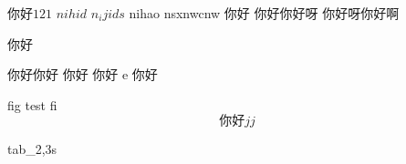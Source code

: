 你好$121$
$nihid$ 
$n_ijids$ nihao
nsxnwcnw
你好
你好你好呀 你好呀你好啊 

你好

你好你好 你好 
你好 e
你好

fig test fi
\begin{equation}
  你好 jj
\end{equation}

tab_2,3s

